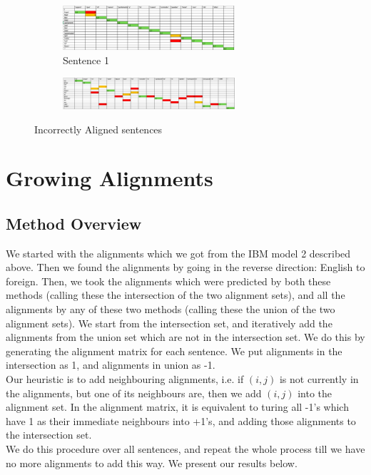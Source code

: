 \documentclass{article}
\begin{document}
		\begin{figure}[htbp]
			\center
			\begin{subfigure}{\textwidth}
				\includegraphics[width=0.7\textwidth]{misalignment.png}
				\caption{Sentence 1}
			\end{subfigure}
			\begin{subfigure}{\textwidth}
				\includegraphics[width=0.7\textwidth]{misalignment_1.png}
			\end{subfigure}
			\caption{Incorrectly Aligned sentences}
		\end{figure}


\section{Growing Alignments}

	\subsection{Method Overview}
		We started with the alignments which we got from the IBM model 2 described above. Then we found the alignments by going in the reverse direction: English to foreign. Then, we took the alignments which were predicted by both these methods (calling these the intersection of the two alignment sets), and all the alignments by any of these two methods (calling these the union of the two alignment sets). We start from the intersection set, and iteratively add the alignments from the union set which are not in the intersection set. We do this by generating the alignment matrix for each sentence. We put alignments in the intersection as 1, and alignments in union as -1.
		\\Our heuristic is to add neighbouring alignments, i.e. if $(i,j)$ is not currently in the alignments, but one of its neighbours are, then we add $(i,j)$ into the alignment set. In the alignment matrix, it is equivalent to turing all -1's which have 1 as their immediate neighbours into +1's, and adding those alignments to the intersection set.
		\\We do this procedure over all sentences, and repeat the whole process till we have no more alignments to add this way. We present our results below.
\end{document}
